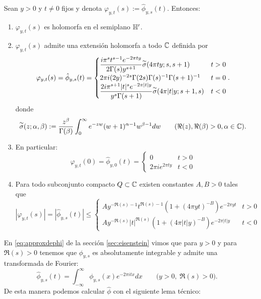 \documentclass[../../tesis_maestria]{subfiles}
\begin{document}
\begin{prop}\label{ap:de_phihat}
  Sean $y>0$ y $t\neq0$ fijos y denota $\varphi_{y,t}(s):=\hat{\phi}_{y,s}(t)$. Entonces:
  \begin{enumerate}[label=\roman*)]
  \item $\varphi_{y,t}(s)$ es holomorfa en el semiplano $\mathbb{H}'$.
  \item $\varphi_{y,t}(s)$ admite una extensi\'on holomorfa a todo $\mathbb{C}$ definida por
    \begin{equation}\label{ap:formulaphihat}
      \varphi_{y,t}(s)=\hat{\phi}_{y,s}(t)=
      \begin{cases}
        \dfrac{i\pi^st^{s-1}e^{-2\pi ty}}{2\Gamma(s)y^{s+1}}\overset{\sim}{\sigma}(4\pi ty;s,s+1) &t>0\\
        2\pi i(2y)^{-2s}\Gamma(2s)\Gamma(s)^{-1}\Gamma(s+1)^{-1} &t=0\\
        \dfrac{2i\pi^{s+1}|t|^se^{-2\pi|t|y}}{y^s\Gamma(s+1)}\overset{\sim}{\sigma}(4\pi|t|y;s+1,s) &t<0
      \end{cases}.
    \end{equation}
    donde
    \[
      \overset{\sim}{\sigma}(z;\alpha,\beta):=\frac{z^{\beta}}{\Gamma(\beta)}\int_0^{\infty}e^{-zw}(w+1)^{\alpha-1}w^{\beta-1}dw
  \qquad(\Re(z),\Re(\beta)>0,\alpha\in\mathbb{C}).
    \]
  \item\label{ap:inciso3} En particular:
    \[
      \varphi_{y,t}(0)=\hat{\phi}_{y,0}(t)=
      \begin{cases}
        0 & t>0\\
        2\pi i e^{2\pi ty} &t<0
      \end{cases}
    \]
  \item\label{ap:inciso4} Para todo subconjunto compacto $Q\subset\mathbb{C}$ existen constantes $A,B>0$
    tales que
    \[
      |\varphi_{y,t}(s)|=|\hat{\phi}_{y,s}(t)|\leq
      \begin{cases}
        A y^{-\Re(s)-1}t^{\Re(s)-1}(1+(4\pi yt)^{-B})e^{-2\pi yt} & t>0\\
        A y^{-\Re(s)}|t|^{\Re(s)}(1+(4\pi |t|y)^{-B})e^{-2\pi|t|y} & t<0
      \end{cases}
    \]
  \end{enumerate}
\end{prop}

En \eqref{eq:approxdephi} de la secci\'on \ref{sec:eisenstein} vimos que para $y>0$ y para
$\Re(s)>0$ tenemos que $\phi_{y,s}$ es absolutamente integrable y admite una transformada de Fourier:
\begin{equation}
  \label{ap:phihat}
  \hat{\phi}_{y,s}(t)=\int_{-\infty}^{\infty}\phi_{y,s}(x)e^{-2\pi i tx}dx
  \qquad \big(y>0,\; \Re(s)>0\big).
\end{equation}
De esta manera podemos calcular $\hat{\phi}$ con el siguiente lema t\'ecnico:
\end{document}

